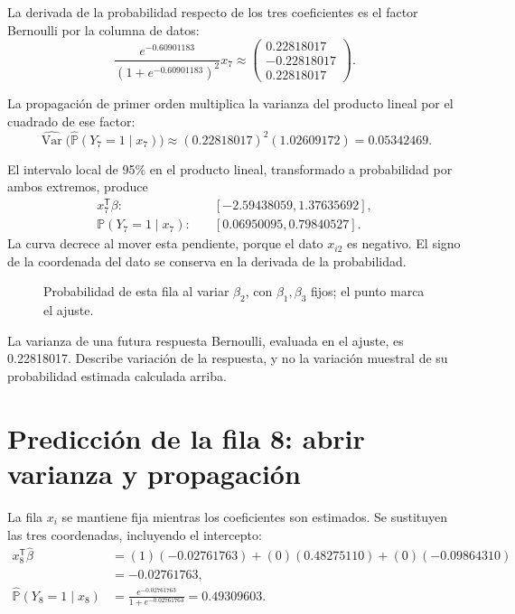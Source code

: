 \documentclass[11pt,a4paper]{article}
\newcommand{\Prob}{\mathbb P}
\newcommand{\T}{^{\mathsf T}}
\DeclareMathOperator{\Var}{Var}
\begin{document}
La derivada de la probabilidad respecto de los tres coeficientes
es el factor Bernoulli por la columna de datos:
\[
\frac{e^{-0.60901183}}{(1+e^{-0.60901183})^2}x_{7}\approx\begin{pmatrix}0.22818017\\-0.22818017\\0.22818017\end{pmatrix}.
\]

La propagación de primer orden multiplica la varianza del
producto lineal por el cuadrado de ese factor:
\[
\widehat{\Var}\bigl(\widehat{\Prob}(Y_{7}=1\mid x_{7})\bigr)\approx(0.22818017)^2(1.02609172)=0.05342469.
\]

El intervalo local de 95\% en el producto lineal,
transformado a probabilidad por ambos extremos, produce
\[
\begin{aligned}
x_{7}\T\beta:&\quad[-2.59438059,1.37635692],\\\Prob(Y_{7}=1\mid x_{7}):&\quad[0.06950095,0.79840527].\end{aligned}
\]
La curva decrece al mover esta pendiente, porque el dato $x_{i2}$ es negativo. El signo de la coordenada del dato se conserva en la derivada de la probabilidad.
\begin{figure}[H]\centering
{}
\caption{Probabilidad de esta fila al variar \(\beta_2\), con \(\beta_1,\beta_3\) fijos; el punto marca el ajuste.}
\end{figure}

La varianza de una futura respuesta Bernoulli,
evaluada en el ajuste, es 0.22818017.
Describe variación de la respuesta, y no la variación
muestral de su probabilidad estimada calculada arriba.
\endgroup

\clearpage
\section{Predicción de la fila 8: abrir varianza y propagación}\label{logit117}
\begingroup\small
\setlength{\abovedisplayskip}{4pt}\setlength{\belowdisplayskip}{4pt}
La fila \(x_i\) se mantiene fija mientras los coeficientes
son estimados. Se sustituyen las tres coordenadas,
incluyendo el intercepto:
\[
\begin{aligned}
x_{8}\T\widehat\beta&=(1)(-0.02761763)+(0)(0.48275110)+(0)(-0.09864310)\\&=-0.02761763,\\\widehat{\Prob}(Y_{8}=1\mid x_{8})&=\frac{e^{-0.02761763}}{1+e^{-0.02761763}}=0.49309603.\end{aligned}
\]
\end{document}
